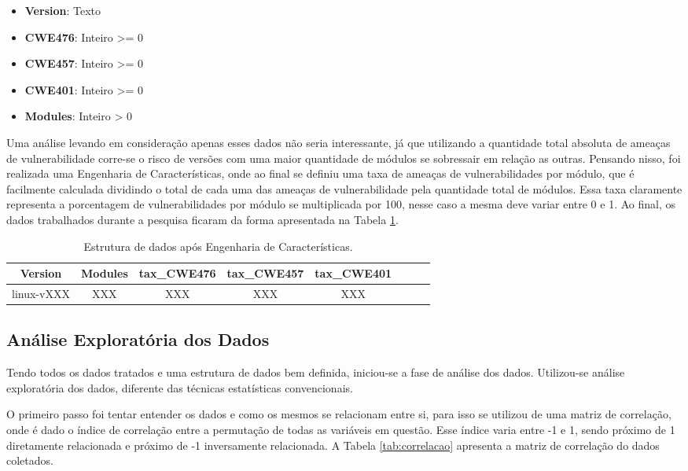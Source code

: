 \begin{itemize}
  \item \textbf{Version}: Texto
  \item \textbf{CWE476}: Inteiro >= 0
  \item \textbf{CWE457}: Inteiro >= 0
  \item \textbf{CWE401}: Inteiro >= 0
  \item \textbf{Modules}: Inteiro > 0
\end{itemize}

Uma análise levando em consideração apenas esses dados não seria interessante,
já que utilizando a quantidade total absoluta de ameaças de vulnerabilidade
corre-se o risco de versões com uma maior quantidade de módulos se sobressair
em relação as outras. Pensando nisso, foi realizada uma Engenharia de
Características, onde ao final se definiu uma taxa de ameaças de
vulnerabilidades por módulo, que é facilmente calculada dividindo o total de
cada uma das ameaças de vulnerabilidade pela quantidade total de módulos. Essa
taxa claramente representa a porcentagem de vulnerabilidades por módulo se
multiplicada por 100, nesse caso a mesma deve variar entre 0 e 1. Ao final, os
dados trabalhados durante a pesquisa ficaram da forma apresentada na
Tabela \ref{tab:data_frame}.

\begin{table}[h]
\centering
\begin{tabular}{cccccccc}
\hline
\rowcolor[HTML]{EFEFEF} 
{Version} & {Modules} & {tax\_CWE476} & {tax\_CWE457} & {tax\_CWE401} \\ \hline
linux-vXXX    & XXX           & XXX              & XXX              & XXX  \\
\hline
\end{tabular}
\caption{Estrutura de dados após Engenharia de Características.}
\label{tab:data_frame}
\end{table}


\subsection{Análise Exploratória dos Dados}\label{eda}

Tendo todos os dados tratados e uma estrutura de dados bem definida, iniciou-se
a fase de análise dos dados. Utilizou-se análise exploratória dos dados,
diferente das técnicas estatísticas convencionais.

O primeiro passo foi tentar entender os dados e como os mesmos se relacionam
entre si, para isso se utilizou de uma matriz de correlação, onde é dado o
índice de correlação entre a permutação de todas as variáveis em questão. Esse
índice varia entre -1 e 1, sendo próximo de 1 diretamente relacionada e próximo de
-1 inversamente relacionada. A Tabela \ref{tab:correlacao} apresenta a matriz de
correlação do dados coletados.


